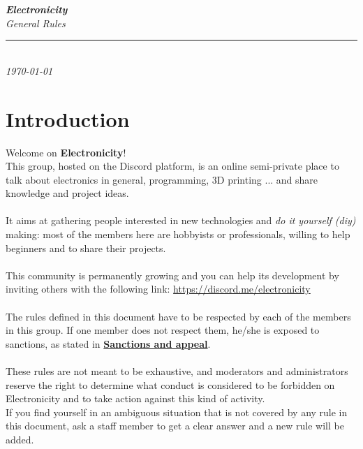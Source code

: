 \documentclass[a4paper]{article}
\begin{document}
\begin{titlepage}
	\begin{center}
		\vspace*{5cm}
		\textsl{{\Huge \textbf{Electronicity}\\\vspace*{.5cm}General Rules}}\\
		\vspace*{1cm}
		\rule{.7\linewidth}{0.5mm}\\
		\vspace*{1cm}
		\textsl{{\large \today}}\\
	\end{center}
\end{titlepage}
\tableofcontents
\pagebreak
\section{Introduction}
Welcome on \textbf{Electronicity}!\\
This group, hosted on the Discord platform, is an online semi-private place to talk about electronics in general, programming, 3D printing ... and share knowledge and project ideas.\\
\\
It aims at gathering people interested in new technologies and \textsl{do it yourself {\footnotesize (diy)}} making: most of the members here are hobbyists or professionals, willing to help beginners and to share their projects.\\
\\
This community is permanently growing and you can help its development by inviting others with the following link: \url{https://discord.me/electronicity}\\
\\
The rules defined in this document have to be respected by each of the members in this group. If one member does not respect them, he/she is exposed to sanctions, as stated in \hyperref[sec:sanctions]{\textbf{Sanctions and appeal}}.\\\\
These rules are not meant to be exhaustive, and moderators and administrators reserve the right to determine what conduct is considered to be forbidden on Electronicity and to take action against this kind of activity.\\
If you find yourself in an ambiguous situation that is not covered by any rule in this document, ask a staff member to get a clear answer and a new rule will be added.\\
\end{document}
